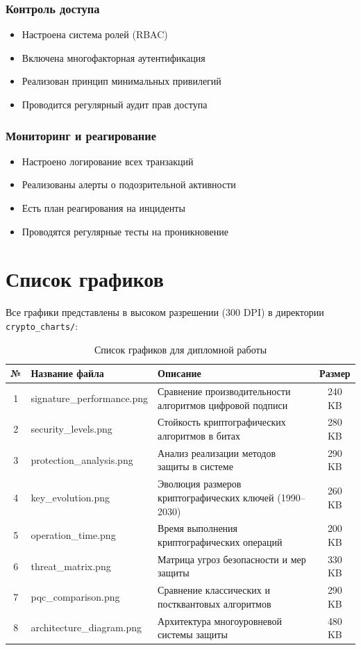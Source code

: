 \documentclass[a4paper,14pt]{extreport}
\begin{document}
\subsection*{Контроль доступа}
\begin{itemize}
    \item[$\square$] Настроена система ролей (RBAC)
    \item[$\square$] Включена многофакторная аутентификация
    \item[$\square$] Реализован принцип минимальных привилегий
    \item[$\square$] Проводится регулярный аудит прав доступа
\end{itemize}

\subsection*{Мониторинг и реагирование}
\begin{itemize}
    \item[$\square$] Настроено логирование всех транзакций
    \item[$\square$] Реализованы алерты о подозрительной активности
    \item[$\square$] Есть план реагирования на инциденты
    \item[$\square$] Проводятся регулярные тесты на проникновение
\end{itemize}

\chapter{Список графиков}

Все графики представлены в высоком разрешении (300 DPI) в директории \texttt{crypto\_charts/}:

\begin{table}[H]
\centering
\caption{Список графиков для дипломной работы}
\label{tab:charts_list}
\begin{tabular}{|c|l|l|c|}
\hline
\textbf{№} & \textbf{Название файла} & \textbf{Описание} & \textbf{Размер} \\
\hline
1 & signature\_performance.png & Сравнение производительности алгоритмов цифровой подписи & 240 KB \\
2 & security\_levels.png & Стойкость криптографических алгоритмов в битах & 280 KB \\
3 & protection\_analysis.png & Анализ реализации методов защиты в системе & 290 KB \\
4 & key\_evolution.png & Эволюция размеров криптографических ключей (1990--2030) & 260 KB \\
5 & operation\_time.png & Время выполнения криптографических операций & 200 KB \\
6 & threat\_matrix.png & Матрица угроз безопасности и мер защиты & 330 KB \\
7 & pqc\_comparison.png & Сравнение классических и постквантовых алгоритмов & 290 KB \\
8 & architecture\_diagram.png & Архитектура многоуровневой системы защиты & 480 KB \\
\hline
\end{tabular}
\end{table}
\end{document}

